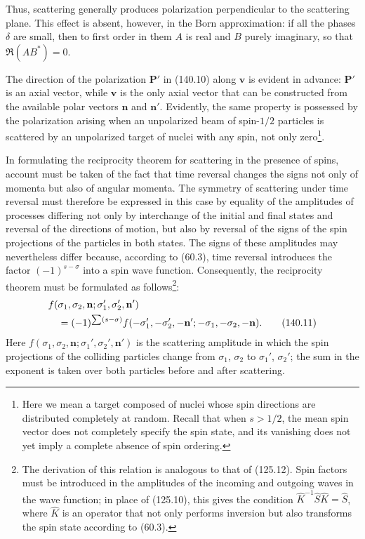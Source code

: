 Thus, scattering generally produces polarization perpendicular to the scattering plane. This effect is absent, however, in the Born approximation: if all the phases $\delta$ are small, then to first order in them $A$ is real and $B$ purely imaginary, so that $\Re(AB^*)=0$.

The direction of the polarization $\mathbf P'$ in (140.10) along $\mathbf v$ is evident in advance: $\mathbf P'$ is an axial vector, while $\mathbf v$ is the only axial vector that can be constructed from the available polar vectors $\mathbf n$ and $\mathbf n'$. Evidently, the same property is possessed by the polarization arising when an unpolarized beam of spin-$1/2$ particles is scattered by an unpolarized target of nuclei with any spin, not only zero\footnote{Here we mean a target composed of nuclei whose spin directions are distributed completely at random. Recall that when $s>1/2$, the mean spin vector does not completely specify the spin state, and its vanishing does not yet imply a complete absence of spin ordering.}.

In formulating the reciprocity theorem for scattering in the presence of spins, account must be taken of the fact that time reversal changes the signs not only of momenta but also of angular momenta. The symmetry of scattering under time reversal must therefore be expressed in this case by equality of the amplitudes of processes differing not only by interchange of the initial and final states and reversal of the directions of motion, but also by reversal of the signs of the spin projections of the particles in both states. The signs of these amplitudes may nevertheless differ because, according to (60.3), time reversal introduces the factor $(-1)^{s-\sigma}$ into a spin wave function. Consequently, the reciprocity theorem must be formulated as follows\footnote{The derivation of this relation is analogous to that of (125.12). Spin factors must be introduced in the amplitudes of the incoming and outgoing waves in the wave function; in place of (125.10), this gives the condition $\hat K^{-1}\hat S\hat K=\hat S$, where $\hat K$ is an operator that not only performs inversion but also transforms the spin state according to (60.3).}:
\begin{align}
 &f(\sigma_1,\sigma_2,\mathbf n;\sigma_1',\sigma_2',\mathbf n')\notag\\
 &\quad=(-1)^{\sum(s-\sigma)}f(-\sigma_1',-\sigma_2',-\mathbf n';-\sigma_1,-\sigma_2,-\mathbf n).
 \tag{140.11}
\end{align}
Here $f(\sigma_1,\sigma_2,\mathbf n;\sigma_1',\sigma_2',\mathbf n')$ is the scattering amplitude in which the spin projections of the colliding particles change from $\sigma_1$, $\sigma_2$ to $\sigma_1'$, $\sigma_2'$; the sum in the exponent is taken over both particles before and after scattering.

